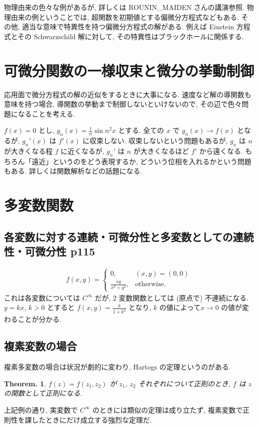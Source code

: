 \documentclass[openany, a4paper, oneside]{book}
\theoremstyle{break}
\newtheorem{thm}{Theorem.}[section]
\theoremstyle{breakdefn}
\begin{document}
物理由来の色々な例があるが, 詳しくは ROUNIN\_MAIDEN さんの講演参照.
物理由来の例ということでは, 超関数を初期値とする偏微分方程式などもある.
その他, 適当な意味で特異性を持つ偏微分方程式の解がある.
例えば Einstein 方程式とその Schwarzschild 解に対して, その特異性はブラックホールに関係する.
\section{可微分関数の一様収束と微分の挙動制御}
\label{sec-11-3-12}

応用面で微分方程式の解の近似をするときに大事になる.
速度など解の導関数も意味を持つ場合, 導関数の挙動まで制御しないといけないので, その辺で色々問題になることを考える.

$f (x) = 0$ とし, $g_n (x) = \frac{1}{n} \sin n^2 x$ とする.
全ての $x$ で $g_n (x) \to f (x)$ となるが, $g_n'(x)$ は $f'(x)$ に収束しない.
収束しないという問題もあるが, $g_n$ は $n$ が大きくなる程 $f$ に近くなるが, $g_n'$ は $n$ が大きくなるほど $f'$ から遠くなる.
もちろん「遠近」というのをどう表現するか, どういう位相を入れるかという問題もある.
詳しくは関数解析などの話題になる.
\section{多変数関数}
\label{sec-11-3-13}
\subsection{各変数に対する連続・可微分性と多変数としての連続性・可微分性 \cite{GelbaumOlmsted1} p115}
\label{sec-11-3-13-1}

\begin{align}
 f (x, y)
 =
 \begin{cases}
  0,                  & (x, y) = (0, 0) \\
  \frac{xy}{x^2+y^2}, & \mathrm{otherwise}.
 \end{cases}
\end{align}
これは各変数については $C^{\infty}$ だが, 2 変数関数としては (原点で) 不連続になる.
$y = k x$, $k > 0$ とすると $f (x, y) = \frac{k}{1 + k^2}$ となり, $k$ の値によって$x \to 0$ の値が変わることが分かる.
\subsection{複素変数の場合}
\label{sec-11-3-13-2}

複素多変数の場合は状況が劇的に変わり, Hartogs の定理というのがある.
\begin{thm}
 $f (z) = f (z_1, z_2)$ が $z_1$, $z_2$ それぞれについて正則のとき, $f$ は $z$ の関数として正則になる.
\end{thm}
上記例の通り, 実変数で $C^{\infty}$ のときには類似の定理は成り立たず, 複素変数で正則性を課したときにだけ成立する強烈な定理だ.
\end{document}
